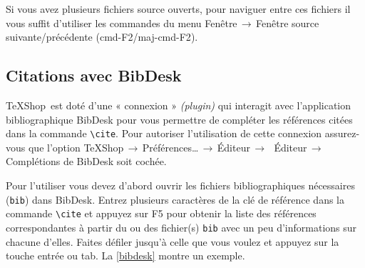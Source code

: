 \documentclass[11pt,french]{article}
\newcommand{\TS}{\textsf{\TeX Shop}}
\newcommand{\cmd}[1]{\textsf{#1}}
\newcommand{\mnu}[1]{\textsf{#1}}
\newcommand{\To}{\,\(\to\)\,}
\begin{document}
Si vous avez plusieurs fichiers source ouverts, pour naviguer entre ces fichiers il vous suffit d'utiliser les commandes du menu \mnu{Fenêtre}\To\mnu{Fenêtre source suivante/précédente} (\cmd{cmd-F2}/\cmd{maj-cmd-F2}).


\subsection{Citations avec \cmd{BibDesk}} 

\TS\ est doté d'une « connexion » \emph{(plugin)} qui interagit avec l'application bibliographique \cmd{BibDesk} pour vous permettre de compléter les références citées dans la commande \verb|\cite|. Pour autoriser l'utilisation de cette connexion assurez-vous que l'option \mnu{TeXShop}\To\mnu{Préférences…}\To\mnu{Éditeur}\To\ \mnu{Éditeur}\To\mnu{Complétions de BibDesk} soit cochée.

Pour l'utiliser vous devez d'abord ouvrir les fichiers bibliographiques nécessaires (\texttt{bib}) dans \cmd{BibDesk}. Entrez plusieurs caractères de la clé de référence dans la commande \verb|\cite| et appuyez sur \cmd{F5} pour obtenir la liste des références correspondantes à partir du ou des fichier(s) \texttt{bib} avec un peu d'informations sur chacune d'elles. Faites défiler jusqu'à celle que vous voulez et appuyez sur la touche \cmd{entrée} ou \cmd{tab}. La \vref{bibdesk} montre un exemple.
\end{document}
